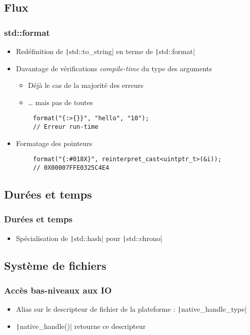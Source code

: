 \documentclass[C++.tex]{subfiles}
\begin{document}
\subsection*{Flux}
\begin{frame}[fragile]
	\frametitle{{\NoAutoSpacing std::format}}
	\begin{itemize}
		\item Redéfinition de \texttt|std::to_string| en terme de \texttt|std::format|
		\item Davantage de vérifications \textit{compile-time} du type des arguments
		\begin{itemize}
			\item Déjà le cas de la majorité des erreurs
			\item \ldots{} mais pas de toutes
		\end{itemize}
	\end{itemize}

	\begin{verbatim}
		format("{:>{}}", "hello", "10");
		// Erreur run-time
	\end{verbatim}

	\begin{itemize}
		\item Formatage des pointeurs
	\end{itemize}

	\begin{verbatim}
		format("{:#018X}", reinterpret_cast<uintptr_t>(&i));
		// 0X00007FFE0325C4E4
	\end{verbatim}
\end{frame}

\subsection*{Durées et temps}
\begin{frame}[fragile]
	\frametitle{Durées et temps}
	\begin{itemize}
		\item Spécialisation de \texttt|std::hash| pour \texttt|std::chrono|
	\end{itemize}
\end{frame}

\subsection*{Système de fichiers}
\begin{frame}[fragile]
	\frametitle{Accès bas-niveaux aux IO}
	\begin{itemize}
		\item Alias sur le descripteur de fichier de la plateforme : \texttt|native_handle_type|
		
		 
		\item \texttt|native_handle()| retourne ce descripteur
	\end{itemize}
\end{frame}
\end{document}
